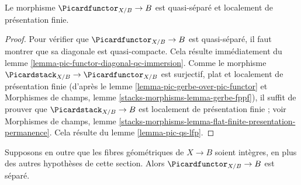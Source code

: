 \begin{lemma}
\label{lemma-pic-functor-qs-lfp}
Le morphisme $\Picardfunctor_{X/B} \to B$ est quasi-séparé et localement
de présentation finie.
\end{lemma}

\begin{proof}
Pour vérifier que $\Picardfunctor_{X/B} \to B$ est quasi-séparé, il faut
montrer que sa diagonale est quasi-compacte. Cela résulte immédiatement du
lemme \ref{lemma-pic-functor-diagonal-qc-immersion}.
Comme le morphisme
$\Picardstack_{X/B} \to \Picardfunctor_{X/B}$ est surjectif, plat et
localement de présentation finie (d'après le lemme
\ref{lemma-pic-gerbe-over-pic-functor} et Morphismes de champs, lemme
\ref{stacks-morphisms-lemma-gerbe-fppf}), il suffit de prouver que
$\Picardstack_{X/B} \to B$ est localement de présentation finie ; voir
Morphismes de champs, lemme
\ref{stacks-morphisms-lemma-flat-finite-presentation-permanence}.
Cela résulte du lemme \ref{lemma-pic-qs-lfp}.
\end{proof}

\begin{lemma}
\label{lemma-pic-functor-uniqueness-part}
Supposons en outre que les fibres géométriques de $X \to B$ soient
intègres, en plus des autres hypothèses de cette section.
Alors $\Picardfunctor_{X/B} \to B$ est séparé.
\end{lemma}

